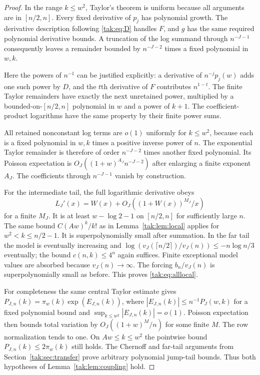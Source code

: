 \documentclass[11pt,letterpaper]{article}
\theoremstyle{remark}\newtheorem{remark}[theorem]{Remark}
\begin{document}
\begin{proof}
In the range $k\leq w^2$, Taylor's theorem is uniform because all arguments are in $[n/2,n]$. Every fixed derivative of $p_j$ has polynomial growth. The derivative description following \eqref{tak:eq:D} handles $F$, and $g$ has the same required polynomial derivative bounds. A truncation of the log summand through $n^{-J-1}$ consequently leaves a remainder bounded by $n^{-J-2}$ times a fixed polynomial in $w,k$.

Here the powers of $n^{-1}$ can be justified explicitly: a derivative of $n^{-j}p_j(w)$ adds one such power by $D$, and the $t$th derivative of $F$ contributes $n^{1-t}$. The finite Taylor remainders have exactly the next unretained power, multiplied by a bounded-on-$[n/2,n]$ polynomial in $w$ and a power of $k+1$. The coefficient-product logarithms have the same property by their finite power sums.

All retained nonconstant log terms are $o(1)$ uniformly for $k\leq w^2$, because each is a fixed polynomial in $w,k$ times a positive inverse power of $n$. The exponential Taylor remainder is therefore of order $n^{-J-2}$ times another fixed polynomial. Its Poisson expectation is $O_J((1+w)^{A_J}n^{-J-2})$ after enlarging a finite exponent $A_J$. The coefficients through $n^{-J-1}$ vanish by construction.

For the intermediate tail, the full logarithmic derivative obeys
\[
 L_J'(x)=W(x)+O_J((1+W(x))^{M_J}/x)
\]
for a finite $M_J$. It is at least $w-\log2-1$ on $[n/2,n]$ for sufficiently large $n$. The same bound $C(Aw)^k/k!$ as in Lemma~\ref{tak:lem:local} applies for $w^2<k\leq n/2-1$. It is superpolynomially small after summation. In the far tail the model is eventually increasing and
$\log(v_J(\lceil n/2\rceil)/v_J(n))\leq-n\log n/3$ eventually; the bound $c(n,k)\leq4^n$ again suffices. Finite exceptional model values are absorbed because $v_J(n)\to\infty$. The forcing $b_n/v_J(n)$ is superpolynomially small as before. This proves \eqref{tak:eq:alllocal}.

For completeness the same central Taylor estimate gives
$P_{J,n}(k)=\pi_w(k)\exp(E_{J,n}(k))$, where
$|E_{J,n}(k)|\leq n^{-1}P_J(w,k)$ for a fixed polynomial bound and $\sup_{k\leq w^2}|E_{J,n}(k)|=o(1)$. Poisson expectation then bounds total variation by $O_J((1+w)^{M}/n)$ for some finite $M$. The row normalization tends to one. On $Aw\leq k\leq w^2$ the pointwise bound $P_{J,n}(k)\leq2\pi_w(k)$ still holds. The Chernoff and far-tail arguments from Section~\ref{tak:sec:transfer} prove arbitrary polynomial jump-tail bounds. Thus both hypotheses of Lemma~\ref{tak:lem:coupling} hold.
\end{proof}
\end{document}
